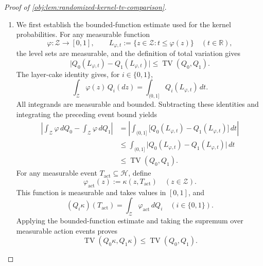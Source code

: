 \begin{proof}[Proof of \cref{obj:lem:randomized-kernel-tv-comparison}]
\begin{enumerate}
\item We first establish the bounded-function estimate used for the kernel probabilities. For any measurable function
\[
\varphi:\mathcal Z\longrightarrow[0,1],
\qquad
L_{\varphi,t}:=\{z\in\mathcal Z:t\le\varphi(z)\}
\quad(t\in\mathbb R),
\]
the level sets are measurable, and the definition of total variation gives
\[
\bigl|Q_0(L_{\varphi,t})-Q_1(L_{\varphi,t})\bigr|
\le \operatorname{TV}(Q_0,Q_1).
\]
The layer-cake identity gives, for \(i\in\{0,1\}\),
\[
\int_{\mathcal Z}\varphi(z)\,Q_i(dz)
=
\int_{(0,1]}Q_i(L_{\varphi,t})\,dt.
\]
All integrands are measurable and bounded. Subtracting these identities and integrating the preceding event bound yields
\[
\begin{aligned}
\left|
\int_{\mathcal Z}\varphi\,dQ_0-
\int_{\mathcal Z}\varphi\,dQ_1
\right|
&=
\left|\int_{(0,1]}
\bigl[Q_0(L_{\varphi,t})-Q_1(L_{\varphi,t})\bigr]\,dt\right|\\
&\le
\int_{(0,1]}
\bigl|Q_0(L_{\varphi,t})-Q_1(L_{\varphi,t})\bigr|\,dt\\
&\le \operatorname{TV}(Q_0,Q_1).
\end{aligned}
\]
For any measurable event \(T_{\mathrm{act}}\subseteq\mathcal H\), define
\[
\varphi_{\mathrm{act}}(z):=\kappa(z,T_{\mathrm{act}})
\quad(z\in\mathcal Z).
\]
This function is measurable and takes values in \([0,1]\), and
\[
(Q_i\kappa)(T_{\mathrm{act}})
=
\int_{\mathcal Z}\varphi_{\mathrm{act}}\,dQ_i
\quad(i\in\{0,1\}).
\]
Applying the bounded-function estimate and taking the supremum over measurable action events proves
\[
\operatorname{TV}(Q_0\kappa,Q_1\kappa)
\le \operatorname{TV}(Q_0,Q_1).
\]


\end{enumerate}
\end{proof}

